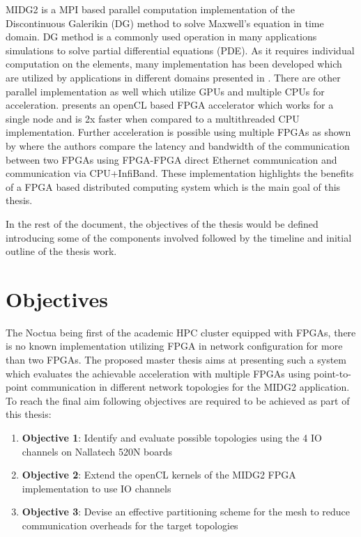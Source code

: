 \documentclass[english,notitlepage]{hgbreport}
\begin{document}
MIDG2 is a MPI based parallel computation implementation of the Discontinuous Galerikin (DG) \cite{hesthaven_nodal_2008} method
to solve Maxwell's equation in time domain. DG method is a commonly used operation in many applications simulations to solve
partial differential equations (PDE). As it requires individual computation on the elements, many implementation
has been developed which are utilized by applications in different domains presented in \cite{ye_discontinuous_2011, wilcox_high-order_2010,
collis_discontinuous_2002}. There are other parallel implementation as well which utilize GPUs \cite{afzal_solving_2018, klockner_nodal_2009}
and multiple CPUs \cite{baggag_parallel_1999} for acceleration. \textcite{kenter_opencl-based_2018} presents an openCL based
FPGA accelerator which works for a single node and is 2x faster when compared to a multithreaded CPU implementation. Further acceleration
is possible using multiple FPGAs as shown by \textcite{kobayashi_opencl-ready_2018} where the authors compare the latency and bandwidth
of the communication between two FPGAs using FPGA-FPGA direct Ethernet communication and communication via CPU+InfiBand.
These implementation highlights the benefits of a FPGA based distributed computing system which is the main goal of this thesis.

In the rest of the document, the objectives of the thesis would be defined introducing some of the components involved followed
by the timeline and initial outline of the thesis work.


\section{Objectives}

The Noctua being first of the academic HPC cluster equipped with FPGAs, there is no known implementation
utilizing FPGA in network configuration for more than two FPGAs. The proposed master thesis aims at presenting
such a system which evaluates the achievable acceleration with multiple FPGAs using point-to-point communication
in different network topologies for the MIDG2 application. To reach the final aim following objectives are
required to be achieved as part of this thesis:

\begin{enumerate}
	\item \textbf{Objective 1}: Identify and evaluate possible topologies using the 4 IO channels on Nallatech 520N boards
	\item \textbf{Objective 2}: Extend the openCL kernels of the MIDG2 FPGA implementation to use IO channels
	\item \textbf{Objective 3}: Devise an effective partitioning scheme for the mesh to reduce communication overheads for the target topologies
\end{enumerate}
\end{document}
